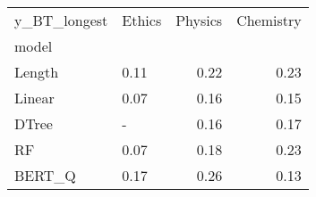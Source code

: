 \begin{tabular}{llrr}
\toprule
y\_BT\_longest & Ethics &  Physics &  Chemistry \\
model  &        &          &            \\
\midrule
Length &   0.11 &     0.22 &       0.23 \\
Linear &   0.07 &     0.16 &       0.15 \\
DTree  &      - &     0.16 &       0.17 \\
RF     &   0.07 &     0.18 &       0.23 \\
BERT\_Q &   0.17 &     0.26 &       0.13 \\
\bottomrule
\end{tabular}
